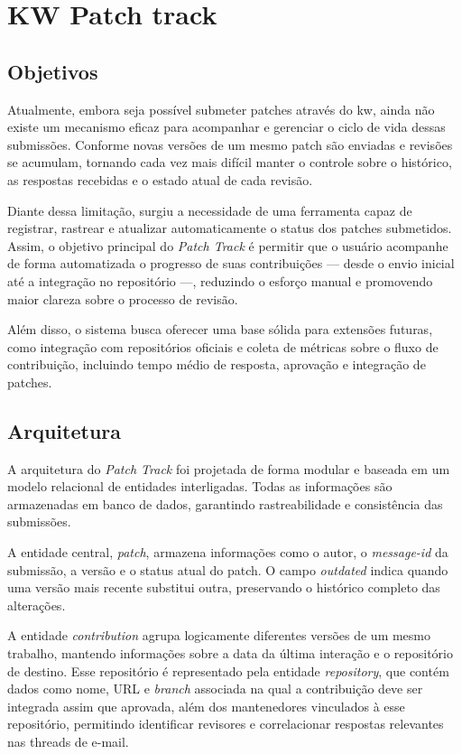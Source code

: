 \section{KW Patch track}

\subsection{Objetivos}

Atualmente, embora seja possível submeter patches através do kw, ainda não existe um mecanismo eficaz para acompanhar e gerenciar o ciclo de vida dessas submissões. Conforme novas versões de um mesmo patch são enviadas e revisões se acumulam, tornando cada vez mais difícil manter o controle sobre o histórico, as respostas recebidas e o estado atual de cada revisão.

Diante dessa limitação, surgiu a necessidade de uma ferramenta capaz de registrar, rastrear e atualizar automaticamente o status dos patches submetidos. Assim, o objetivo principal do \textit{Patch Track} é permitir que o usuário acompanhe de forma automatizada o progresso de suas contribuições — desde o envio inicial até a integração no repositório —, reduzindo o esforço manual e promovendo maior clareza sobre o processo de revisão.

Além disso, o sistema busca oferecer uma base sólida para extensões futuras, como integração com repositórios oficiais e coleta de métricas sobre o fluxo de contribuição, incluindo tempo médio de resposta, aprovação e integração de patches.

\subsection{Arquitetura}

A arquitetura do \textit{Patch Track} foi projetada de forma modular e baseada em um modelo relacional de entidades interligadas. Todas as informações são armazenadas em banco de dados, garantindo rastreabilidade e consistência das submissões.

A entidade central, \textit{patch}, armazena informações como o autor, o \textit{message-id} da submissão, a versão e o status atual do patch. O campo \textit{outdated} indica quando uma versão mais recente substitui outra, preservando o histórico completo das alterações.

A entidade \textit{contribution} agrupa logicamente diferentes versões de um mesmo trabalho, mantendo informações sobre a data da última interação e o repositório de destino. Esse repositório é representado pela entidade \textit{repository}, que contém dados como nome, URL e \textit{branch} associada na qual a contribuição deve ser integrada assim que aprovada, além dos mantenedores vinculados à esse repositório, permitindo identificar revisores e correlacionar respostas relevantes nas threads de e-mail.

